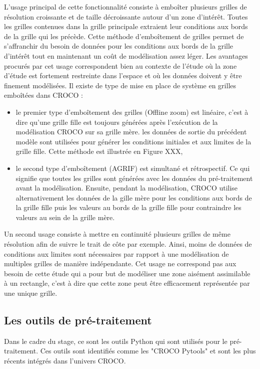 \documentclass[10pt,a4paper,titlepage]{article}
\begin{document}
L'usage principal de cette fonctionnalité consiste à emboîter plusieurs grilles de résolution croissante et de taille décroissante autour d'un zone d'intérêt.
Toutes les grilles contenues dans la grille principale extraient leur conditions aux bords de la grille qui les précède.
Cette méthode d'emboîtement de grilles permet de s'affranchir du besoin de données pour les conditions aux bords de la grille d'intérêt tout en maintenant un coût de modélisation assez léger.
Les avantages procurés par cet usage correspondent bien au contexte de l'étude où la zone d'étude est fortement restreinte dans l'espace et où les données doivent y être finement modélisées.
Il existe de type de mise en place de système en grilles emboîtées dans CROCO :
\begin{itemize}
    \item le premier type d'emboîtement des grilles (Offline zoom) est linéaire, c'est à dire qu'une grille fille est toujours générées après l'exécution de la modélisation CROCO sur sa grille mère.
    les données de sortie du précédent modèle sont utilisées pour générer les conditions initiales et aux limites de la grille fille.
    Cette méthode est illustrée en Figure XXX,
    \item le second type d'emboîtement (AGRIF) est simultané et rétrospectif.
    Ce qui signifie que toutes les grilles sont générées avec les données du pré-traitement avant la modélisation.
    Ensuite, pendant la modélisation, CROCO utilise alternativement les données de la gille mère pour les conditions aux bords de la grille fille puis les valeurs au bords de la grille fille pour contraindre les valeurs au sein de la grille mère.
\end{itemize}

Un second usage consiste à mettre en continuité plusieurs grilles de même résolution afin de suivre le trait de côte par exemple.
Ainsi, moins de données de conditions aux limites sont nécessaires par rapport à une modélisation de multiples grilles de manière indépendante.
Cet usage ne correspond pas aux besoin de cette étude qui a pour but de modéliser une zone aisément assimilable à un rectangle, c'est à dire que cette zone peut être efficacement représentée par une unique grille.


\subsection{Les outils de pré-traitement}
\label{sub:outils_pretraitement}
Dans le cadre du stage, ce sont les outils Python qui sont utilisés pour le pré-traitement. Ces outils sont identifiés comme les "CROCO Pytools" et sont les plus récents intégrés dans l'univers CROCO.
\end{document}
